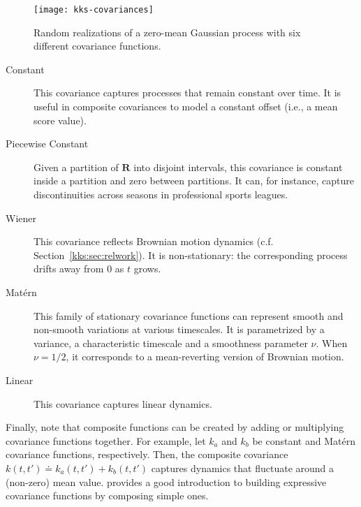 \begin{figure*}[t]
	\texttt{[image: kks-covariances]}
	\caption{Random realizations of a zero-mean Gaussian process with six different covariance functions.}
	\label{kks:fig:covariances}
\end{figure*}

\begin{description}
	\item[Constant] This covariance captures processes that remain constant over time.
	      It is useful in composite covariances to model a constant offset (i.e., a mean score value).

	\item[Piecewise Constant]
	      Given a partition of $\mathbf{R}$ into disjoint intervals, this covariance is constant inside a partition and zero between partitions.
	      It can, for instance, capture discontinuities across seasons in professional sports leagues.

	\item[Wiener] This covariance reflects Brownian motion dynamics (c.f. Section~\ref{kks:sec:relwork}).
	      It is non-stationary: the corresponding process drifts away from $0$ as $t$ grows.

	\item[Matérn] This family of stationary covariance functions can represent smooth and non-smooth variations at various timescales.
	      It is parametrized by a variance, a characteristic timescale and a smoothness parameter $\nu$.
	      When $\nu = 1/2$, it corresponds to a mean-reverting version of Brownian motion.

	\item[Linear] This covariance captures linear dynamics.
\end{description}

Finally, note that composite functions can be created by adding or multiplying covariance functions together.
For example, let $k_a$ and $k_b$ be constant and Matérn covariance functions, respectively.
Then, the composite covariance $k(t, t') \doteq k_a(t, t') + k_b(t, t')$ captures dynamics that fluctuate around a (non-zero) mean value.
\citet[Sec. 2.3]{duvenaud2014automatic} provides a good introduction to building expressive covariance functions by composing simple ones.
